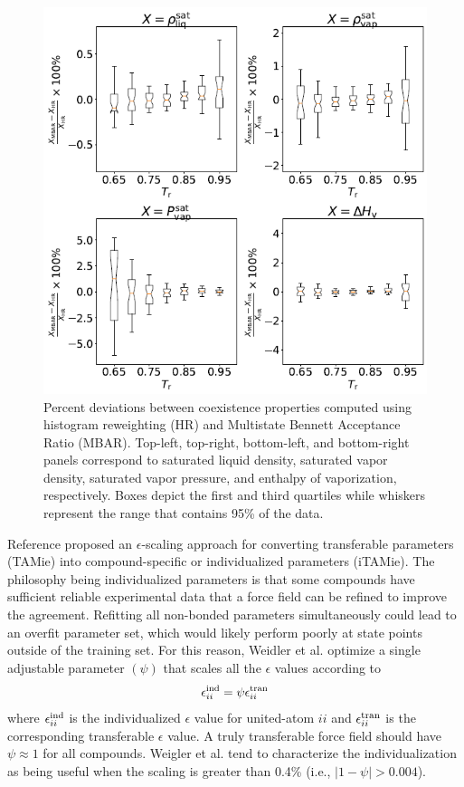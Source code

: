 \documentclass[journal=jced,manuscript=article]{achemso}
\begin{document}
	\begin{figure}[htb!]
		\centering
		\includegraphics[width=6.4in]{Comparison_MBAR_HR_boxplot_CI.png}
		\caption{Percent deviations between coexistence properties computed using histogram reweighting (HR) and Multistate Bennett Acceptance Ratio (MBAR). Top-left, top-right, bottom-left, and bottom-right panels correspond to saturated liquid density, saturated vapor density, saturated vapor pressure, and enthalpy of vaporization, respectively. Boxes depict the first and third quartiles while whiskers represent the range that contains 95\% of the data.}
		\label{fig:comparison MBAR HR}
	\end{figure}


Reference  proposed an $\epsilon$-scaling approach for converting transferable parameters (TAMie) into compound-specific or individualized parameters (iTAMie). The philosophy being individualized parameters is that some compounds have sufficient reliable experimental data that a force field can be refined to improve the agreement. Refitting all non-bonded parameters simultaneously could lead to an overfit parameter set, which would likely perform poorly at state points outside of the training set. For this reason, Weidler et al. optimize a single adjustable parameter $(\psi)$ that scales all the $\epsilon$ values according to
\begin{equation}
\epsilon_{ii}^{\rm ind} = \psi \epsilon_{ii}^{\rm tran}
\end{equation}
where $\epsilon_{ii}^{\rm ind}$ is the individualized $\epsilon$ value for united-atom $ii$ and $\epsilon_{ii}^{\rm tran}$ is the corresponding transferable $\epsilon$ value. A truly transferable force field should have $\psi \approx 1$ for all compounds. Weigler et al. tend to characterize the individualization as being useful when the scaling is greater than 0.4\% (i.e., $|1 - \psi| > 0.004$). 
\end{document}
